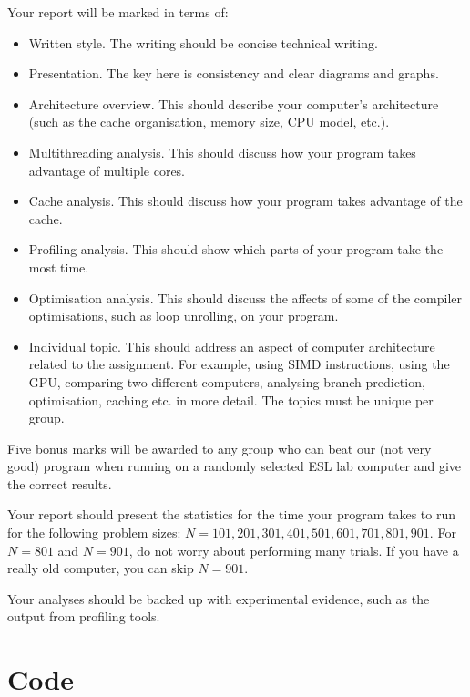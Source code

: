 \documentclass[a4paper,11pt]{article}
\begin{document}
Your report will be marked in terms of:
%
\begin{itemize}
\item Written style.  The writing should be concise technical writing.

\item Presentation.  The key here is consistency and clear diagrams
  and graphs.

\item Architecture overview.  This should describe your computer's
  architecture (such as the cache organisation, memory size, CPU model,
  etc.).

\item Multithreading analysis.  This should discuss how your program
  takes advantage of multiple cores.

\item Cache analysis.  This should discuss how your program takes
  advantage of the cache.

\item Profiling analysis.  This should show which parts of your
  program take the most time.

\item Optimisation analysis.  This should discuss the affects of some
  of the compiler optimisations, such as loop unrolling, on your
  program.

\item Individual topic.  This should address an aspect of computer
  architecture related to the assignment.  For example, using SIMD
  instructions, using the GPU, comparing two different computers,
  analysing branch prediction, optimisation, caching etc. in more
  detail.  The topics must be unique per group.
\end{itemize}
%

Five bonus marks will be awarded to any group who can beat our (not
very good) program when running on a randomly selected ESL lab
computer and give the correct results.

Your report should present the statistics for the time your program
takes to run for the following problem sizes: $N=101, 201, 301, 401,
501, 601, 701, 801, 901$.  For $N=801$ and $N=901$, do not worry about
performing many trials.  If you have a really old computer, you can
skip $N=901$.

Your analyses should be backed up with experimental evidence, such as
the output from profiling tools.


\section{Code}
\end{document}

